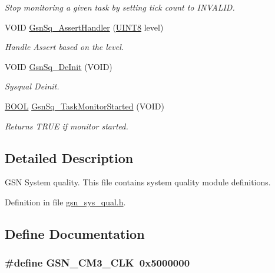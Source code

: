 \begin{DoxyCompactItemize}
\begin{DoxyCompactList}\small\item\em Stop monitoring a given task by setting tick count to INVALID. \end{DoxyCompactList}\item 
VOID \hyperlink{a00675_ga8f76a4cc1c863a3ca744e3c377f3a4bd}{GsnSq\_\-AssertHandler} (\hyperlink{a00660_gab27e9918b538ce9d8ca692479b375b6a}{UINT8} level)
\begin{DoxyCompactList}\small\item\em Handle Assert based on the level. \end{DoxyCompactList}\item 
VOID \hyperlink{a00675_ga14affd26fb768070a8d90706441b8c8d}{GsnSq\_\-DeInit} (VOID)
\begin{DoxyCompactList}\small\item\em Sysqual Deinit. \end{DoxyCompactList}\item 
\hyperlink{a00660_ga1f04022c0a182c51c059438790ea138c}{BOOL} \hyperlink{a00675_gac34869e67e126c75fd2f750c34fe1789}{GsnSq\_\-TaskMonitorStarted} (VOID)
\begin{DoxyCompactList}\small\item\em Returns TRUE if monitor started. \end{DoxyCompactList}\end{DoxyCompactItemize}


\subsection{Detailed Description}
GSN System quality. This file contains system quality module definitions. 

Definition in file \hyperlink{a00593_source}{gsn\_\-sys\_\-qual.h}.



\subsection{Define Documentation}
\hypertarget{a00593_a35b32ccea91b55e06b21da8d33908d47}{
\subsubsection[{GSN\_\-CM3\_\-CLK}]{\setlength{\rightskip}{0pt plus 5cm}\#define GSN\_\-CM3\_\-CLK~0x5000000}}
\label{a00593_a35b32ccea91b55e06b21da8d33908d47}


